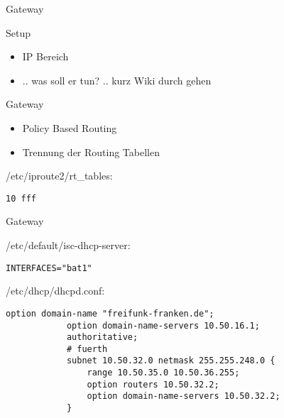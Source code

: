 \begin{frame}{Gateway}
    \begin{block}{Setup}
        \begin{itemize}
            \item IP Bereich
            \item .. was soll er tun? .. kurz Wiki durch gehen
        \end{itemize}
    \end{block}
\end{frame}

\begin{frame}[fragile]{Gateway}
    \begin{itemize}
        \item Policy Based Routing
        \item Trennung der Routing Tabellen
    \end{itemize}

    \begin{block}{/etc/iproute2/rt\_tables:}
        \scriptsize
        \begin{lstlisting}[gobble=12]
            10 fff
        \end{lstlisting}
    \end{block}
\end{frame}

\begin{frame}[fragile]{Gateway}
    \begin{block}{/etc/default/isc-dhcp-server:}
        \scriptsize
        \begin{lstlisting}[gobble=12]
            INTERFACES="bat1"
        \end{lstlisting}
    \end{block}

    \begin{block}{/etc/dhcp/dhcpd.conf:}
        \scriptsize
        \begin{lstlisting}[gobble=12]
            option domain-name "freifunk-franken.de";
            option domain-name-servers 10.50.16.1;
            authoritative;
            # fuerth
            subnet 10.50.32.0 netmask 255.255.248.0 {
                range 10.50.35.0 10.50.36.255;
                option routers 10.50.32.2;
                option domain-name-servers 10.50.32.2;
            }
        \end{lstlisting}
    \end{block}
\end{frame}

